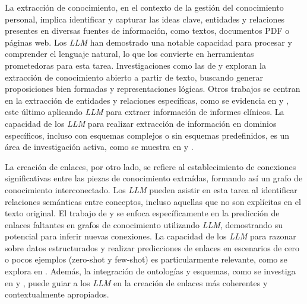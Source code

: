 La extracción de conocimiento, en el contexto de la gestión del conocimiento personal, implica identificar y capturar las ideas clave, entidades y relaciones presentes en diversas fuentes de información, como textos, documentos PDF o páginas web. Los \textit{LLM} han demostrado una notable capacidad para procesar y comprender el lenguaje natural, lo que los convierte en herramientas prometedoras para esta tarea. Investigaciones como las de \parencite{vandurmeOpenKnowledgeExtraction2008} y \parencite{mccuskerLOKELinkedOpen2023} exploran la extracción de conocimiento abierto a partir de texto, buscando generar proposiciones bien formadas y representaciones lógicas. Otros trabajos se centran en la extracción de entidades y relaciones específicas, como se evidencia en \parencite{martinez-rodriguezMiningInformationSentences2022} y \parencite{liAutomatedClinicalData2024}, este último aplicando \textit{LLM} para extraer información de informes clínicos. La capacidad de los \textit{LLM} para realizar extracción de información en dominios específicos, incluso con esquemas complejos o sin esquemas predefinidos, es un área de investigación activa, como se muestra en \parencite{liKnowCoderCodingStructured2024} y \parencite{zhangExtractDefineCanonicalize2024}.

La creación de enlaces, por otro lado, se refiere al establecimiento de conexiones significativas entre las piezas de conocimiento extraídas, formando así un grafo de conocimiento interconectado. Los \textit{LLM} pueden asistir en esta tarea al identificar relaciones semánticas entre conceptos, incluso aquellas que no son explícitas en el texto original. El trabajo de \parencite{shuKnowledgeGraphLarge2024} y \parencite{heLinkGPTTeachingLarge2024} se enfoca específicamente en la predicción de enlaces faltantes en grafos de conocimiento utilizando \textit{LLM}, demostrando su potencial para inferir nuevas conexiones. La capacidad de los \textit{LLM} para razonar sobre datos estructurados y realizar predicciones de enlaces en escenarios de cero o pocos ejemplos (zero-shot y few-shot) es particularmente relevante, como se explora en \parencite{cartaIterativeZeroShotLLM2023}. Además, la integración de ontologías y esquemas, como se investiga en \parencite{fengOntologygroundedAutomaticKnowledge2024} y \parencite{luoOneKEDockerizedSchemaGuided2025}, puede guiar a los \textit{LLM} en la creación de enlaces más coherentes y contextualmente apropiados.

